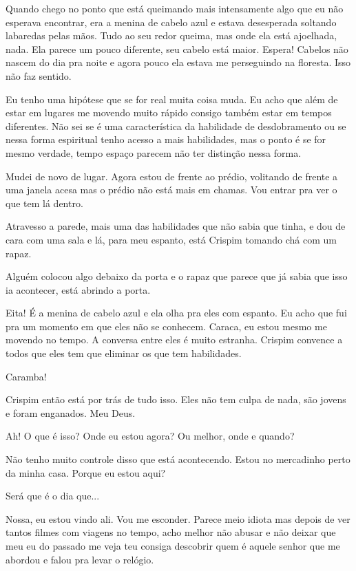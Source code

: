 Quando chego no ponto que está queimando mais intensamente algo que eu não esperava encontrar, era a menina de cabelo azul e estava desesperada soltando labaredas pelas mãos. Tudo ao seu redor queima, mas onde ela está ajoelhada, nada.
Ela parece um pouco diferente, seu cabelo está maior. 
Espera! Cabelos não nascem do dia pra noite e agora pouco ela estava me perseguindo na floresta. Isso não faz sentido.

Eu tenho uma hipótese que se for real muita coisa muda. Eu acho que além de estar em lugares me movendo muito rápido consigo também estar em tempos diferentes. Não sei se é uma característica da habilidade de desdobramento ou se nessa forma espiritual tenho acesso a mais habilidades, mas o ponto é se for mesmo verdade, tempo espaço parecem não ter distinção nessa forma.

Mudei de novo de lugar. Agora estou de frente ao prédio, volitando de frente a uma janela acesa mas o prédio não está mais em chamas. Vou entrar pra ver o que tem lá dentro.

Atravesso a parede, mais uma das habilidades que não sabia que tinha, e dou de cara com uma sala e lá, para meu espanto, está Crispim tomando chá com um rapaz.

Alguém colocou algo debaixo da porta e o rapaz que parece que já sabia que isso ia acontecer, está abrindo a porta.

Eita! É a menina de cabelo azul e ela olha pra eles com espanto. Eu acho que fui pra um momento em que eles não se conhecem. Caraca, eu estou mesmo me movendo no tempo.
A conversa entre eles é muito estranha. Crispim convence a todos que eles tem que eliminar os que tem habilidades.

Caramba!

Crispim então está por trás de tudo isso. Eles não tem culpa de nada, são jovens e foram enganados. Meu Deus.

Ah! O que é isso?
Onde eu estou agora?
Ou melhor, onde e quando?

Não tenho muito controle disso que está acontecendo. 
Estou no mercadinho perto da minha casa. Porque eu estou aqui?

Será que é o dia que...

Nossa, eu estou vindo ali. Vou me esconder. Parece meio idiota mas depois de ver tantos filmes com viagens no tempo, acho melhor não abusar e não deixar que meu eu do passado me veja
teu consiga descobrir quem é aquele senhor que me abordou e falou pra levar o relógio.

